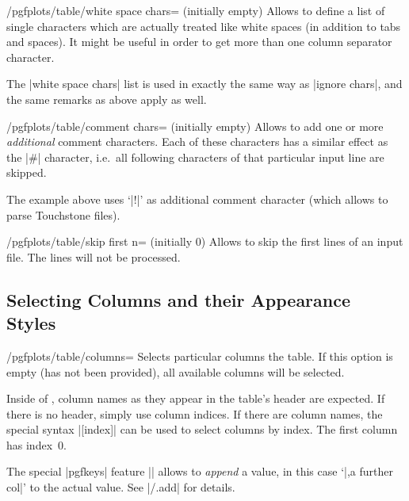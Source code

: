 \begin{key}{/pgfplots/table/white space chars= (initially empty)}
	Allows to define a list of single characters which are actually treated like white spaces (in addition to tabs and spaces). It might be useful in order to get more than one column separator character.

	The |white space chars| list is used in exactly the same way as |ignore chars|, and the same remarks as above apply as well.
\end{key}

\begin{key}{/pgfplots/table/comment chars= (initially empty)}
	Allows to add one or more \emph{additional} comment characters. Each of these characters has a similar effect as the |#| character, i.e.\ all following characters of that particular input line are skipped.
\begin{codeexample}[]
\end{codeexample}
	The example above uses `|!|' as additional comment character (which allows to parse Touchstone files).
\end{key}

\begin{key}{/pgfplots/table/skip first n= (initially 0)}
	Allows to skip the first  lines of an input file. The lines will not be processed.
\begin{codeexample}[]
\end{codeexample}
\end{key}

\subsection{Selecting Columns and their Appearance Styles}
\begin{key}{/pgfplots/table/columns=}
	Selects particular columns the table. If this option is empty (has not been provided), all available columns will be selected.

	Inside of , column names as they appear in the table's header are expected. If there is no header, simply use column indices. If there are column names, the special syntax |[index]| can be used to select columns by index. The first column has index~$0$.
\begin{codeexample}[]
\end{codeexample}
	
	The special |pgfkeys| feature || allows to \emph{append} a value, in this case `|,a further col|' to the actual value. See |/.add| for details.
\end{key}

